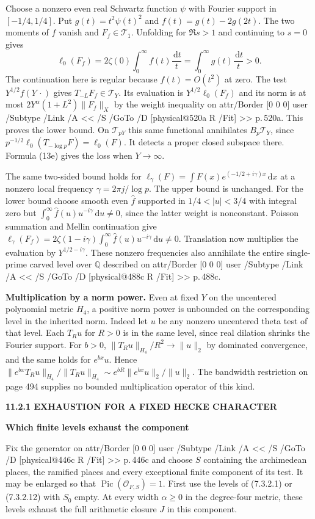\documentclass[11pt,letterpaper]{article}
\makeatletter
\newcommand{\rightmarktext}{}
\newcommand{\printfolio}{}
\newcommand{\leaf}[4]{\clearpage\gdef\printfolio{#1}\gdef\rightmarktext{#2}%
  {\small\sffamily\bfseries\color{ink}#3\par}\vspace{3pt}%
  {\LARGE\bfseries #4\par}\vspace{5pt}}
\newcommand{\point}[1]{\par\smallskip\textbf{#1.}\enspace\ignorespaces}
\newcommand{\Q}{\mathbb Q}
\newcommand{\dd}{\,\mathrm d}
\newcommand{\MusicPDFPageRef}[1]{\pdfpageref\csname physical@#1\endcsname\space\space 0 R}
\newcommand{\pagelink}[2]{\leavevmode\pdfstartlink attr{/Border [0 0 0]} user{%
  /Subtype /Link /A << /S /GoTo /D [\MusicPDFPageRef{#1} /Fit] >>}%
  {\color{ink}#2}\pdfendlink}
\newcommand{\pg}[1]{\pagelink{#1}{p.\,#1}}
\makeatother
\begin{document}
Choose a nonzero even real Schwartz function $\psi$ with Fourier support
in $[-1/4,1/4]$. Put $g(t)=t^2\psi(t)^2$ and $f(t)=g(t)-2g(2t)$.
The two moments of $f$ vanish and $F_f\in\mathcal T_1$. Unfolding for
$\Re s>1$ and continuing to $s=0$ gives
\[
 \ell_0(F_f)=2\zeta(0)\int_0^\infty f(t)\frac{\dd t}{t}
             =\int_0^\infty g(t)\frac{\dd t}{t}>0 .
\]
The continuation here is regular because $f(t)=O(t^2)$ at zero.
The test $Y^{1/2}f(Y\,\cdot)$ gives $T_{-L}F_f\in\mathcal T_Y$.
Its evaluation is $Y^{1/2}\ell_0(F_f)$ and its norm is at most
$2Y^\alpha(1+L^2)\|F_f\|_X$ by the weight inequality on \pg{520a}.
This proves the lower bound. On $\mathcal T_{pY}$ this same functional
annihilates $B_p\mathcal T_Y$, since
$p^{-1/2}\ell_0(T_{-\log p}F)=\ell_0(F)$. It detects a proper closed
subspace there. Formula (13e) gives the loss when $Y\to\infty$.

The same two-sided bound holds for
$\ell_\gamma(F)=\int F(x)e^{(-1/2+i\gamma)x}\dd x$ at a nonzero local
frequency $\gamma=2\pi j/\log p$. The upper bound is unchanged.
For the lower bound choose smooth even $\widehat f$ supported in
$1/4<|u|<3/4$ with integral zero but
$\int_0^\infty\widehat f(u)u^{-i\gamma}\dd u\ne0$, since the latter
weight is nonconstant. Poisson summation and Mellin continuation give
$\ell_\gamma(F_f)=2\zeta(1-i\gamma)\int_0^\infty
\widehat f(u)u^{-i\gamma}\dd u\ne0$. Translation now multiplies the
evaluation by $Y^{1/2-i\gamma}$. These nonzero frequencies also annihilate
the entire single-prime carved level over $\Q$ described on \pg{488c}.

\point{Multiplication by a norm power} Even at fixed $Y$ on the
uncentered polynomial metric $H_4$, a positive norm power is unbounded
on the corresponding level in the inherited norm. Indeed let $u$ be
any nonzero uncentered theta test of that level. Each $T_Ru$ for $R>0$
is in the same level, since real dilation shrinks the Fourier support.
For $b>0$, $\|T_Ru\|_{H_4}/R^2\to\|u\|_2$ by dominated convergence,
and the same holds for $e^{bx}u$. Hence
$\|e^{bx}T_Ru\|_{H_4}/\|T_Ru\|_{H_4}
\sim e^{bR}\|e^{bx}u\|_2/\|u\|_2$. The bandwidth restriction on
page 494 supplies no bounded multiplication operator of this kind.

\leaf{488c}{Paley--Wiener levels}{11.2.1 \quad EXHAUSTION FOR A FIXED HECKE CHARACTER}{Which finite levels exhaust the component}
Fix the generator on \pg{446c} and choose $S$ containing the archimedean
places, the ramified places and every exceptional finite component of
its test. It may be enlarged so that $\operatorname{Pic}(\mathcal O_{F,S})=1$.
First use the levels of (7.3.2.1) or (7.3.2.12) with $S_0$ empty.
At every width $\alpha\ge0$ in the degree-four metric, these levels
exhaust the full arithmetic closure $J$ in this component.
\end{document}
